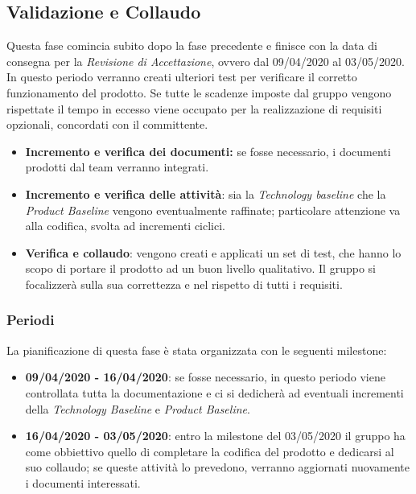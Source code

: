 \subsection{Validazione e Collaudo}
Questa fase comincia subito dopo la fase precedente e finisce con la data di consegna per la \textit{Revisione di Accettazione}, ovvero dal 09/04/2020 al 03/05/2020.\\
In questo periodo verranno creati ulteriori test per verificare il corretto funzionamento del prodotto. Se tutte le scadenze imposte dal gruppo vengono rispettate il tempo in eccesso viene occupato per la realizzazione di requisiti opzionali, concordati con il committente. 

\begin{itemize}
\item \textbf{Incremento e verifica dei documenti:} se fosse necessario, i documenti prodotti dal team verranno integrati.

 \item \textbf{Incremento e verifica delle attività}: sia la \textit{Technology baseline} che la \textit{Product Baseline} vengono eventualmente raffinate; particolare attenzione va alla codifica, svolta ad incrementi ciclici.

 \item \textbf{Verifica e collaudo}: vengono creati e applicati un set di test, che hanno lo scopo di portare il prodotto ad un buon livello qualitativo. Il gruppo si focalizzerà sulla sua correttezza e nel rispetto di tutti i requisiti.
\end{itemize}

\subsubsection{Periodi}
La pianificazione di questa fase è stata organizzata con le seguenti milestone:

\begin{itemize}
\item \textbf{09/04/2020 - 16/04/2020}: se fosse necessario, in questo periodo viene controllata tutta la documentazione e ci si dedicherà ad eventuali incrementi della \textit{Technology Baseline} e \textit{Product Baseline}.

\item \textbf{16/04/2020 - 03/05/2020}: entro la milestone del 03/05/2020 il gruppo ha come obbiettivo quello di completare la codifica del prodotto e dedicarsi al suo collaudo; se queste attività lo prevedono, verranno aggiornati nuovamente i documenti interessati.

\end{itemize}

